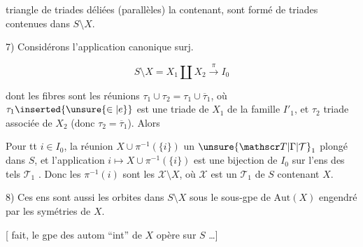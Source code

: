 triangle de triades déliées (parallèles) la contenant, sont formé de triades contenues dans $S\setminus X$.

7) Considérons l'application canonique surj.

\[
S\setminus X=X_1\amalg X_2\xrightarrow{\pi}I_0
\]

dont les fibres sont les réunions $\tau_1\cup\tau_2=\tau_1\cup\overline{\tau}_1$, où $\tau_1\inserted{\unsure{\in|e}}$ est une triade de $X_1$ de la famille $I'_1$, et $\tau_2$   triade associée de $X_2$  (donc $\tau_2=\overline{\tau}_1$). Alors

 Pour tt $i\in I_0$, la réunion $X\cup\pi^{-1}(\{i\})$  un $\unsure{\mathscr T|\Gamma|\mathcal T}_1$ plongé dans $S$,  et l'application $i\longmapsto X\cup\pi^{-1}(\{i\})$ est une bijection de $I_0$ sur l'ens des  tels $\mathscr T_1$ . Donc les $\pi^{-1}(i)$ sont les $\mathscr X\setminus X$, où $\mathscr X$ est un $\mathscr T_1$ de $S$ contenant $X$.

8) Ces ens sont aussi les orbites dans $S\setminus X$ sous le sous-gpe de $\mathrm{Aut}(X)$ engendré par les symétries   de $X$.

[ fait, le gpe des autom ``int'' de $X$ opère sur $S$ \ldots]


